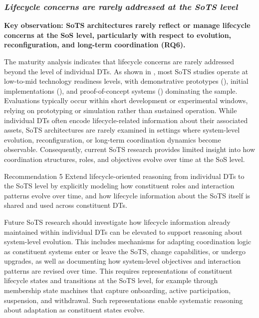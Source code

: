 \subsubsection{\textit{Lifecycle concerns are rarely addressed at the SoTS level}}

\textbf{Key observation: SoTS architectures rarely reflect or manage lifecycle concerns at the SoS level, particularly with respect to evolution, reconfiguration, and long-term coordination (RQ6).}

The maturity analysis indicates that lifecycle concerns are rarely addressed beyond the level of individual DTs. As shown in , most SoTS studies operate at low-to-mid technology readiness levels, with demonstrative prototypes (), initial implementations (), and proof-of-concept systems () dominating the sample. Evaluations typically occur within short development or experimental windows, relying on prototyping or simulation rather than sustained operation. While individual DTs often encode lifecycle-related information about their associated assets, SoTS architectures are rarely examined in settings where system-level evolution, reconfiguration, or long-term coordination dynamics become observable. Consequently, current SoTS research provides limited insight into how coordination structures, roles, and objectives evolve over time at the SoS level.

\begin{recoframe}{Recommendation 5}
Extend lifecycle-oriented reasoning from individual DTs to the SoTS level by explicitly modeling how constituent roles and interaction patterns evolve over time, and how lifecycle information about the SoTS itself is shared and used across constituent DTs.
\end{recoframe}

Future SoTS research should investigate how lifecycle information already maintained within individual DTs can be elevated to support reasoning about system-level evolution. This includes mechanisms for adapting coordination logic as constituent systems enter or leave the SoTS, change capabilities, or undergo upgrades, as well as documenting how system-level objectives and interaction patterns are revised over time. This requires representations of constituent lifecycle states and transitions at the SoTS level, for example through membership state machines that capture onboarding, active participation, suspension, and withdrawal. Such representations enable systematic reasoning about adaptation as constituent states evolve.

